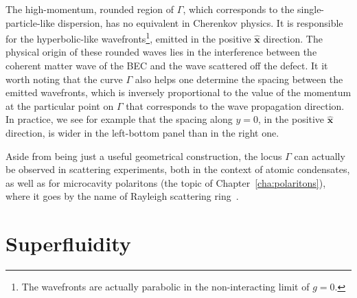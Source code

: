 The high-momentum, rounded region of $\Gamma$, which corresponds to
the single-particle-like dispersion, has no equivalent in Cherenkov
physics. It is responsible for the hyperbolic-like
wavefronts\footnote{The wavefronts are actually parabolic in the
  non-interacting limit of $g=0$.}, emitted in the positive
$\hat{\bm{x}}$ direction. The physical origin of these rounded waves
lies in the interference between the coherent matter wave of the BEC
and the wave scattered off the defect. It it worth noting that the
curve $\Gamma$ also helps one determine the spacing between the
emitted wavefronts, which is inversely proportional to the value of
the momentum at the particular point on $\Gamma$ that corresponds to
the wave propagation direction. In practice, we see for example that
the spacing along $y = 0$, in the positive $\hat{\bm{x}}$ direction,
is wider in the left-bottom panel than in the right one.

Aside from being just a useful geometrical construction, the locus
$\Gamma$ can actually be observed in scattering experiments, both in
the context of atomic condensates, as well as for microcavity
polaritons (the topic of Chapter~\ref{cha:polaritons}), where it goes
by the name of Rayleigh scattering ring~\cite{Ciuti_2005}.





\section{Superfluidity}
\label{sec:superfluid-atom}

